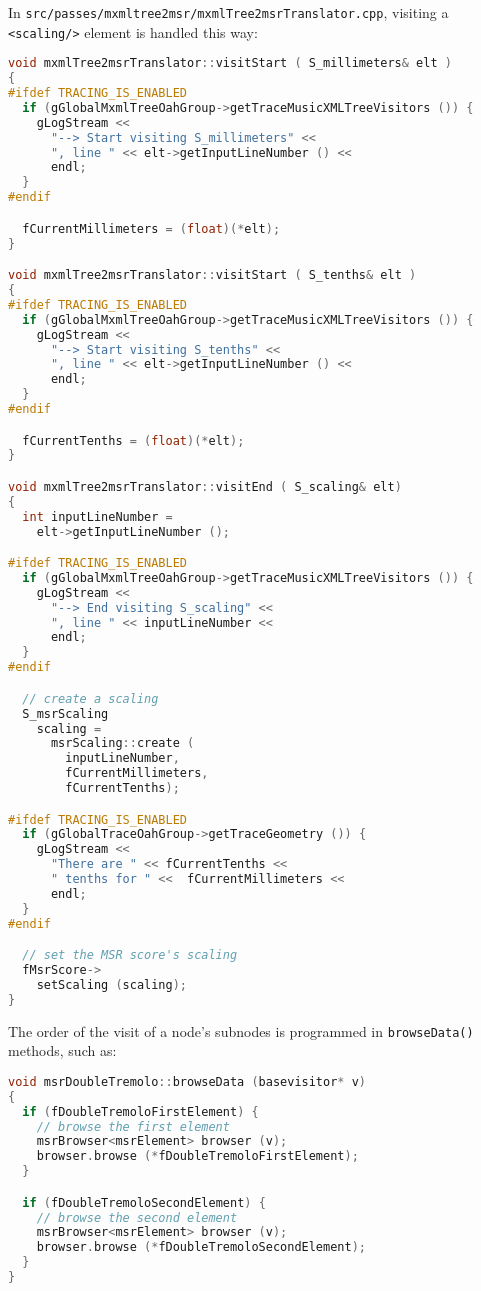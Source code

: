 In {\tt src/passes/mxmltree2msr/mxmlTree2msrTranslator.cpp}, visiting a {\tt <scaling/>} element is handled this way:
\begin{lstlisting}[language=C++,caption={Visiting {\tt <scaling/>}}]
void mxmlTree2msrTranslator::visitStart ( S_millimeters& elt )
{
#ifdef TRACING_IS_ENABLED
  if (gGlobalMxmlTreeOahGroup->getTraceMusicXMLTreeVisitors ()) {
    gLogStream <<
      "--> Start visiting S_millimeters" <<
      ", line " << elt->getInputLineNumber () <<
      endl;
  }
#endif

  fCurrentMillimeters = (float)(*elt);
}

void mxmlTree2msrTranslator::visitStart ( S_tenths& elt )
{
#ifdef TRACING_IS_ENABLED
  if (gGlobalMxmlTreeOahGroup->getTraceMusicXMLTreeVisitors ()) {
    gLogStream <<
      "--> Start visiting S_tenths" <<
      ", line " << elt->getInputLineNumber () <<
      endl;
  }
#endif

  fCurrentTenths = (float)(*elt);
}

void mxmlTree2msrTranslator::visitEnd ( S_scaling& elt)
{
  int inputLineNumber =
    elt->getInputLineNumber ();

#ifdef TRACING_IS_ENABLED
  if (gGlobalMxmlTreeOahGroup->getTraceMusicXMLTreeVisitors ()) {
    gLogStream <<
      "--> End visiting S_scaling" <<
      ", line " << inputLineNumber <<
      endl;
  }
#endif

  // create a scaling
  S_msrScaling
    scaling =
      msrScaling::create (
        inputLineNumber,
        fCurrentMillimeters,
        fCurrentTenths);

#ifdef TRACING_IS_ENABLED
  if (gGlobalTraceOahGroup->getTraceGeometry ()) {
    gLogStream <<
      "There are " << fCurrentTenths <<
      " tenths for " <<  fCurrentMillimeters <<
      endl;
  }
#endif

  // set the MSR score's scaling
  fMsrScore->
    setScaling (scaling);
}
\end{lstlisting}

The order of the visit of a node's subnodes is programmed in {\tt browseData()} methods, such as:
\begin{lstlisting}[language=C++,caption={{\tt msrDoubleTremolo::browseData (basevisitor* v)}}]
void msrDoubleTremolo::browseData (basevisitor* v)
{
  if (fDoubleTremoloFirstElement) {
    // browse the first element
    msrBrowser<msrElement> browser (v);
    browser.browse (*fDoubleTremoloFirstElement);
  }

  if (fDoubleTremoloSecondElement) {
    // browse the second element
    msrBrowser<msrElement> browser (v);
    browser.browse (*fDoubleTremoloSecondElement);
  }
}
\end{lstlisting}

